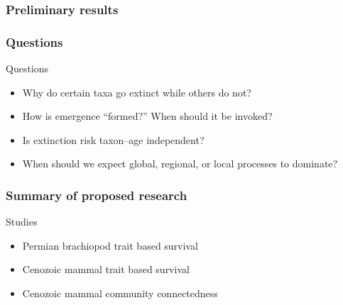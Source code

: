 \documentclass{beamer} \usepackage{amsmath,amsthm}
\begin{document}
\begin{frame}
  \frametitle{Preliminary results}
\end{frame}


\begin{frame}
  \frametitle{Questions}

  \begin{alertblock}{Questions}
    \begin{itemize}
      \item Why do certain taxa go extinct while others do not?
      \item How is emergence ``formed?'' When should it be invoked?
      \item Is extinction risk taxon--age independent?
      \item When should we expect global, regional, or local processes to dominate?
    \end{itemize}
  \end{alertblock}
\end{frame}

\begin{frame}
  \frametitle{Summary of proposed research}

  \begin{alertblock}{Studies}
    \begin{itemize}
      \item Permian brachiopod trait based survival %
      \item Cenozoic mammal trait based survival %
      \item Cenozoic mammal community connectedness %
    \end{itemize}
  \end{alertblock}

\end{frame}
\end{document}
